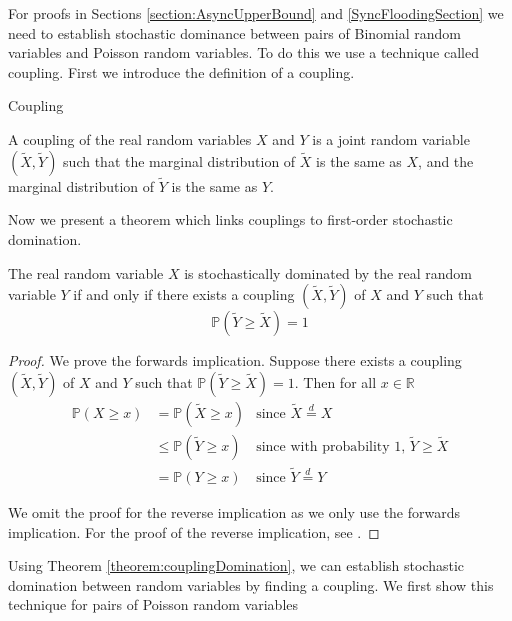 For proofs in Sections \ref{section:AsyncUpperBound} and \ref{SyncFloodingSection} we need to establish stochastic dominance between pairs of Binomial random variables and Poisson random variables. To do this we use a technique called coupling. First we introduce the definition of a coupling.

\begin{definition} %
	Coupling

	\noindent
	A  coupling of the real random variables $X$ and $Y$ is a joint random variable $(\tilde{X}, \tilde{Y})$ such that the marginal distribution of $\tilde{X}$ is the same as $X$, and the marginal distribution of $\tilde{Y}$ is the same as $Y$.
\end{definition}


Now we present a theorem which links couplings to first-order stochastic domination.

\begin{theorem}\label{theorem:couplingDomination}
	The real random variable $X$ is stochastically dominated by the real random variable $Y$ if and only if there exists a coupling $(\tilde{X}, \tilde{Y})$ of $X$ and $Y$ such that
	$$
		\mathbb{P}(\tilde{Y} \geq \tilde{X}) = 1
	$$
\end{theorem}

\begin{proof}
	We prove the forwards implication. Suppose there exists a coupling $(\tilde{X}, \tilde{Y})$ of $X$ and $Y$ such that $\mathbb{P}(\tilde{Y} \geq \tilde{X}) = 1$. Then for all $x \in \mathbb{R}$
	\begin{align*}
		\mathbb{P}(X \geq x) &= \mathbb{P}(\tilde{X} \geq x) & \text{since } \tilde{X} \stackrel{d}{=} X \\
		&\leq \mathbb{P}(\tilde{Y} \geq x) & \text{since with probability 1, } \tilde{Y} \geq \tilde{X} \\
		&= \mathbb{P}(Y \geq x) & \text{since } \tilde{Y} \stackrel{d}{=} Y 
	\end{align*}

	We omit the proof for the reverse implication as we only use the forwards implication. For the proof of the reverse implication, see \cite{coupling}.
\end{proof}


Using Theorem \ref{theorem:couplingDomination}, we can establish stochastic domination between random variables by finding a coupling. We first show this technique	for pairs of Poisson random variables

